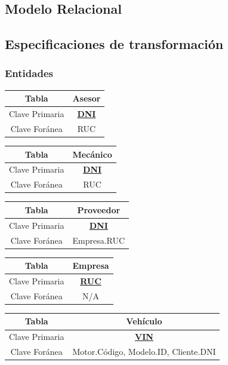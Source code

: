 \documentclass[12pt]{article}
\begin{document}
\subsection{Modelo Relacional}
\subsection{Especificaciones de transformaci\'on}

\subsubsection{Entidades}


\begin{tabular}{|c|c|}
\hline
Tabla & Asesor \\
\hline
Clave Primaria & \textbf{\underline{DNI}} \\
\hline
Clave Foránea & RUC \\
\hline
\end{tabular}


\begin{tabular}{|c|c|}
\hline
Tabla & Mecánico \\
\hline
Clave Primaria & \textbf{\underline{DNI}} \\
\hline
Clave Foránea & RUC \\
\hline
\end{tabular}


\begin{tabular}{|c|c|}
\hline
Tabla & Proveedor \\
\hline
Clave Primaria & \textbf{\underline{DNI}} \\
\hline
Clave Foránea & Empresa.RUC \\
\hline
\end{tabular}


\begin{tabular}{|c|c|}
\hline
Tabla & Empresa \\
\hline
Clave Primaria & \textbf{\underline{RUC}} \\
\hline
Clave Foránea & N/A \\
\hline
\end{tabular}



\begin{tabular}{|c|c|}
\hline
Tabla & Vehículo \\
\hline
Clave Primaria & \textbf{\underline{VIN}} \\
\hline
Clave Foránea & Motor.Código, Modelo.ID, Cliente.DNI \\
\hline
\end{tabular}
\end{document}
